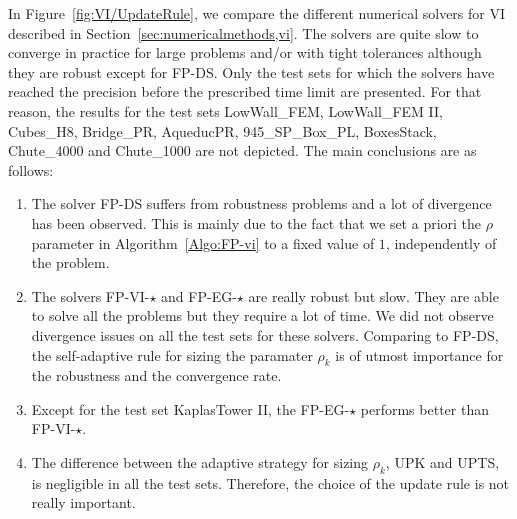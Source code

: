 In Figure~\ref{fig:VI/UpdateRule}, we compare the different numerical solvers for VI described in Section~\ref{sec:numericalmethods,vi}. The solvers are quite slow to converge in practice for large problems and/or with tight tolerances although they are robust except for {\sf FP-DS}. Only the test sets for which the solvers have reached the precision before the prescribed time limit are presented. For that reason, the results for the test sets LowWall\_FEM,  LowWall\_FEM II,  Cubes\_H8, Bridge\_PR, AqueducPR, 945\_SP\_Box\_PL, BoxesStack, Chute\_4000  and Chute\_1000  are not depicted. 
The main conclusions are as follows:
\begin{enumerate}
\item The solver {\sf FP-DS} suffers from robustness problems and a lot of divergence has been observed. This is mainly due to the fact that we set a priori the $\rho$ parameter in Algorithm~\ref{Algo:FP-vi} to a fixed value of $1$, independently of the problem.
\item The solvers {\sf FP-VI-$\star$} and {\sf FP-EG-$\star$} are really robust but slow. They are able to solve all the problems but they require a lot of time. We did not observe divergence issues on all the test sets for these solvers. Comparing to {\sf FP-DS}, the self-adaptive rule for sizing the paramater $\rho_k$ is of utmost importance for the  robustness and the convergence rate.
\item Except for the test set KaplasTower II, the  {\sf FP-EG-$\star$} performs better than  {\sf FP-VI-$\star$}.
\item The difference between the adaptive strategy for sizing $\rho_k$, {\sf UPK} and {\sf UPTS}, is negligible in all the test sets. Therefore, the choice of the update rule is not really important.
\end{enumerate}

